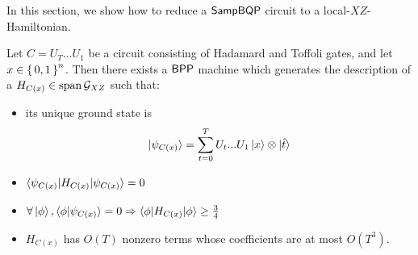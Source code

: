 In this section, we show how to reduce a $\operatorname{\mathsf{SampBQP}}$ circuit to a local-$XZ$-Hamiltonian.

\begin{thm}
	Let $C=U_T\ldots U_1$ be a circuit consisting of Hadamard and Toffoli gates, and let $x\in\set{0, 1}^n$. Then there exists a $\operatorname{\mathsf{BPP}}$  machine which generates the  description of a $H_{C(x)}\in\operatorname*{\operatorname{span}}\mathcal{G}_{XZ}$ such that:
	\begin{itemize}
		\item its unique ground state is $$\ket{\psi_{C(x)}}=\sum_{t=0}^TU_t...U_1\ket{x}\otimes\ket{\hat{t}}$$
		\item $\braket{\psi_{C(x)}|H_{C(x)}|\psi_{C(x)}}=0$
		\item $\forall\ket\phi,\braket{\phi|\psi_{C(x)}}=0\Rightarrow\braket{\phi|H_{C(x)}|\phi}\geq\frac{3}{4}$
		\item $H_{C(x)}$ has $O(T)$ nonzero terms whose coefficients are  at most $O(T^3)$.
	\end{itemize}
\end{thm}

